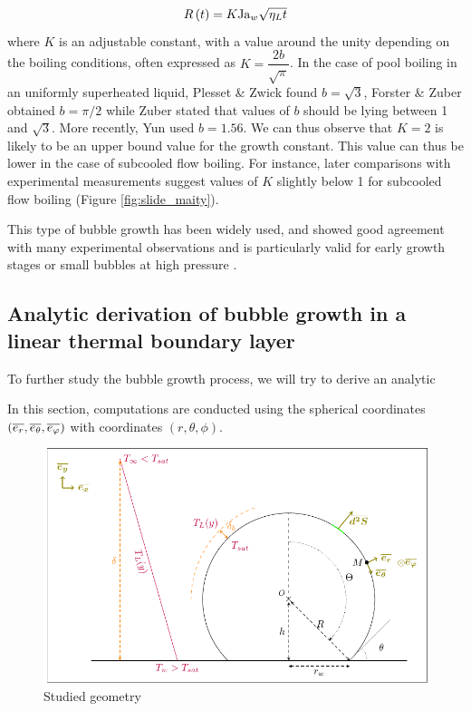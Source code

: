 \begin{equation}
R\left( t \right) = K\mathrm{Ja}_{w} \sqrt{\eta_{L}t}
\end{equation}
where $K$ is an adjustable constant, with a value around the unity depending on the boiling conditions, often expressed as $K=\dfrac{2b}{\sqrt{\pi}}$.  In the case of pool boiling in an uniformly superheated liquid, Plesset \& Zwick \cite{plesset_growth_1954} found $b=\sqrt{3}$, Forster \& Zuber \cite{forster_growth_1954} obtained $b=\pi / 2$ while Zuber  \cite{zuber_dynamics_1961} stated that values of $b$ should be lying between 1 and $\sqrt{3}$. More recently, Yun \etal \cite{yun_prediction_2012} used $b=1.56$. We can thus observe that $K=2$ is likely to be an upper bound value for the growth constant. This value can thus be lower in the case of subcooled flow boiling. For instance, later comparisons with experimental measurements suggest values of $K$ slightly below 1 for subcooled flow boiling (Figure \ref{fig:slide_maity}).

This type of bubble growth has been widely used, and showed good agreement with many experimental observations and is particularly valid for early growth stages or small bubbles at high pressure \cite{kossolapov_experimental_2021, plesset_growth_1954, klausner_vapor_1993}.



\subsection{Analytic derivation of bubble growth in a linear thermal boundary layer}

To further study the bubble growth process, we will try to derive an analytic

In this section, computations are conducted using the spherical coordinates $\left(\overline{e_{r}}, \overline{e_{\theta}}, \overline{e_{\varphi}}\right)$ with coordinates $(r, \theta, \phi)$. 

\begin{figure}[h!]
\centering
\includegraphics[width=0.7\linewidth]{img/growth/growth_analytical.pdf}
\caption{Studied geometry}
\label{fig:anal_growth}
\end{figure}

